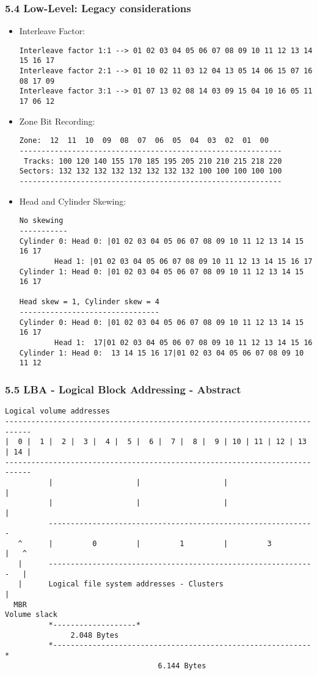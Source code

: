 \begin{frame}[fragile]
  \frametitle{5.4 Low-Level: Legacy considerations}
    \begin{itemize}
        \item[] Interleave Factor:
\begin{lstlisting}[basicstyle=\tiny]
Interleave factor 1:1 --> 01 02 03 04 05 06 07 08 09 10 11 12 13 14 15 16 17 
Interleave factor 2:1 --> 01 10 02 11 03 12 04 13 05 14 06 15 07 16 08 17 09 
Interleave factor 3:1 --> 01 07 13 02 08 14 03 09 15 04 10 16 05 11 17 06 12
\end{lstlisting}
        \item[] Zone Bit Recording:
\begin{lstlisting}[basicstyle=\tiny]
   Zone:  12  11  10  09  08  07  06  05  04  03  02  01  00
------------------------------------------------------------
 Tracks: 100 120 140 155 170 185 195 205 210 210 215 218 220
Sectors: 132 132 132 132 132 132 132 132 100 100 100 100 100
------------------------------------------------------------
\end{lstlisting}
        \item[] Head and Cylinder Skewing:
\begin{lstlisting}[basicstyle=\tiny]
No skewing
-----------
Cylinder 0: Head 0: |01 02 03 04 05 06 07 08 09 10 11 12 13 14 15 16 17
	    Head 1: |01 02 03 04 05 06 07 08 09 10 11 12 13 14 15 16 17
Cylinder 1: Head 0: |01 02 03 04 05 06 07 08 09 10 11 12 13 14 15 16 17

Head skew = 1, Cylinder skew = 4
--------------------------------
Cylinder 0: Head 0: |01 02 03 04 05 06 07 08 09 10 11 12 13 14 15 16 17
	    Head 1:  17|01 02 03 04 05 06 07 08 09 10 11 12 13 14 15 16
Cylinder 1: Head 0:  13 14 15 16 17|01 02 03 04 05 06 07 08 09 10 11 12
\end{lstlisting}
    \end{itemize}
\end{frame}


\begin{frame}[fragile]
  \frametitle{5.5 LBA - Logical Block Addressing - Abstract}
  \begin{lstlisting}[basicstyle=\tiny\ttfamily]
Logical volume addresses
----------------------------------------------------------------------------
|  0 |  1 |  2 |  3 |  4 |  5 |  6 |  7 |  8 |  9 | 10 | 11 | 12 | 13 | 14 |
----------------------------------------------------------------------------
          |                   |                   |                   |
          |                   |                   |                   |
          -------------------------------------------------------------
   ^      |         0         |         1         |         3         |   ^
   |      -------------------------------------------------------------   |
   |      Logical file system addresses - Clusters                        |
  MBR                                                               Volume slack
          *-------------------*
               2.048 Bytes
          *-----------------------------------------------------------*
                                   6.144 Bytes
  \end{lstlisting}
\end{frame}


